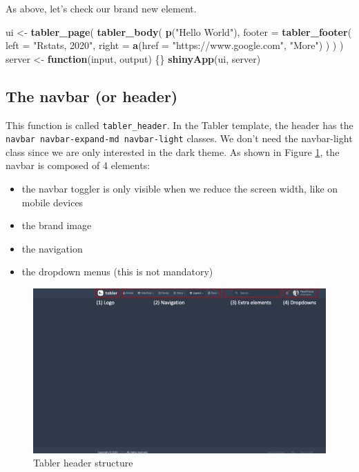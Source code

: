 \documentclass[
]{book}
\newenvironment{Shaded}{\begin{snugshade}}{\end{snugshade}}
\newcommand{\ControlFlowTok}[1]{\textcolor[rgb]{0.13,0.29,0.53}{\textbf{#1}}}
\newcommand{\DataTypeTok}[1]{\textcolor[rgb]{0.13,0.29,0.53}{#1}}
\newcommand{\KeywordTok}[1]{\textcolor[rgb]{0.13,0.29,0.53}{\textbf{#1}}}
\newcommand{\NormalTok}[1]{#1}
\newcommand{\StringTok}[1]{\textcolor[rgb]{0.31,0.60,0.02}{#1}}
\providecommand{\tightlist}{%
  \setlength{\itemsep}{0pt}\setlength{\parskip}{0pt}}
\begin{document}
As above, let's check our brand new element.

\begin{Shaded}
\begin{Highlighting}[]
\NormalTok{ui <-}\StringTok{ }\KeywordTok{tabler_page}\NormalTok{(}
  \KeywordTok{tabler_body}\NormalTok{(}
    \KeywordTok{p}\NormalTok{(}\StringTok{"Hello World"}\NormalTok{),}
    \DataTypeTok{footer =} \KeywordTok{tabler_footer}\NormalTok{(}
      \DataTypeTok{left =} \StringTok{"Rstats, 2020"}\NormalTok{, }
      \DataTypeTok{right =} \KeywordTok{a}\NormalTok{(}\DataTypeTok{href =} \StringTok{"https://www.google.com"}\NormalTok{, }\StringTok{"More"}\NormalTok{)}
\NormalTok{    )}
\NormalTok{  )}
\NormalTok{)}
\NormalTok{server <-}\StringTok{ }\ControlFlowTok{function}\NormalTok{(input, output) \{\}}
\KeywordTok{shinyApp}\NormalTok{(ui, server)}
\end{Highlighting}
\end{Shaded}

\hypertarget{the-navbar-or-header}{%
\subsection{The navbar (or header)}\label{the-navbar-or-header}}

This function is called \texttt{tabler\_header}. In the Tabler template, the header has the \texttt{navbar\ navbar-expand-md\ navbar-light} classes. We don't need the navbar-light class since we are only interested in the dark theme. As shown in Figure \ref{fig:tabler-header}, the navbar is composed of 4 elements:

\begin{itemize}
\tightlist
\item
  the navbar toggler is only visible when we reduce the screen width, like on mobile devices
\item
  the brand image
\item
  the navigation
\item
  the dropdown menus (this is not mandatory)
\end{itemize}

\begin{figure}
\includegraphics[width=20in]{images/practice/tabler-header} \caption{Tabler header structure}\label{fig:tabler-header}
\end{figure}
\end{document}
